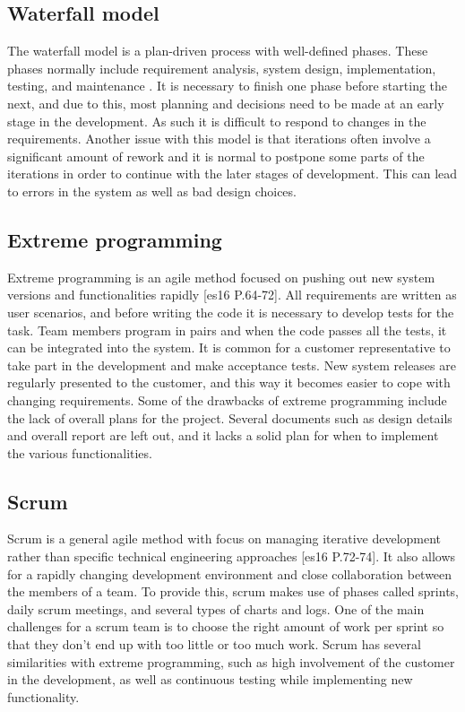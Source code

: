 \subsection{Waterfall model}
The waterfall model is a plan-driven process with well-defined phases. These phases normally include requirement analysis, system design, implementation, testing, and maintenance \cite[p.30-32]{Sommerville}. It is necessary to finish one phase before starting the next, and due to this, most planning and decisions need to be made at an early stage in the development. As such it is difficult to respond to changes in the requirements. Another issue with this model is that iterations often involve a significant amount of rework and it is normal to postpone some parts of the iterations in order to continue with the later stages of development. This can lead to errors in the system as well as bad design choices.

\subsection{Extreme programming}
Extreme programming is an agile method focused on pushing out new system versions and functionalities rapidly [es16 P.64-72]. All requirements are written as user scenarios, and before writing the code it is necessary to develop tests for the task. Team members program  in pairs and when the code passes all the tests, it can be integrated into the system.  It is common for a customer representative to take part in the development and make acceptance tests. New system releases are regularly presented to the customer, and this way it becomes easier to cope with changing requirements. Some of the drawbacks of extreme programming include the lack of overall plans for the project. Several documents such as design details and overall report are left out, and it lacks a solid plan for when to implement the various functionalities.


\subsection{Scrum }
\label{sec:scrum}
Scrum is a general agile method with focus on managing iterative development rather than specific technical engineering approaches [es16 P.72-74]. It also allows for a rapidly changing development environment and close collaboration between the members of a team. To provide this, scrum makes use of phases called sprints, daily scrum meetings, and several types of charts and logs. One of the main challenges for a scrum team is to choose the right amount of work per sprint so that they don’t end up with too little or too much work. Scrum has several similarities with extreme programming, such as high involvement of the customer in the development, as well as continuous testing while implementing new functionality.

